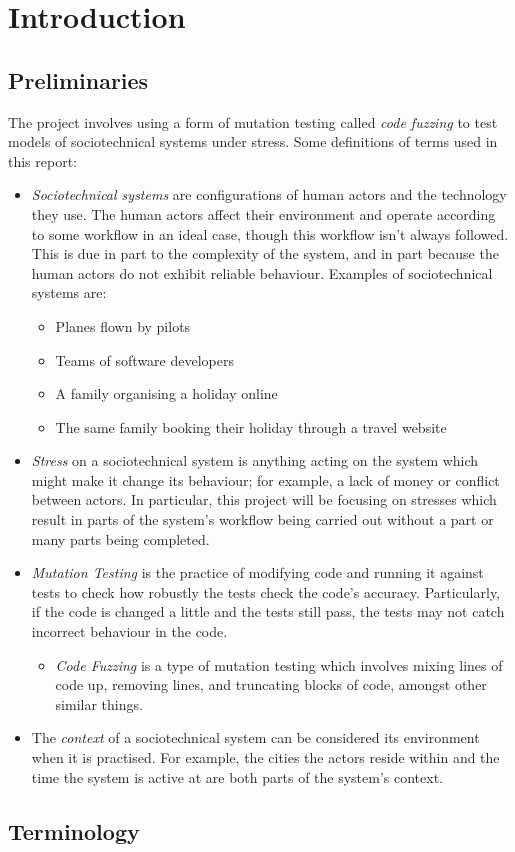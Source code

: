 \chapter{Introduction}
\label{intro}

\section{Preliminaries}
\label{preliminaries}

The project involves using a form of mutation testing called \emph{code fuzzing} to test models of sociotechnical systems under stress. Some definitions of terms used in this report: 
\begin{itemize}
\item \emph{Sociotechnical systems} are configurations of human actors and the technology they use. The human actors affect their environment and operate according to some workflow in an ideal case, though this workflow isn't always followed. This is due in part to the complexity of the system, and in part because the human actors do not exhibit reliable behaviour. Examples of sociotechnical systems are: \begin{itemize}
\item Planes flown by pilots
\item Teams of software developers
\item A family organising a holiday online
\item The same family booking their holiday through a travel website
\end{itemize} 
\item \emph{Stress} on a sociotechnical system is anything acting on the system which might make it change its behaviour; for example, a lack of money or conflict between actors. In particular, this project will be focusing on stresses which result in parts of the system's workflow being carried out without a part or many parts being completed. \par
\item \emph{Mutation Testing} is the practice of modifying code and running it against tests to check how robustly the tests check the code's accuracy. Particularly, if the code is changed a little and the tests still pass, the tests may not catch incorrect behaviour in the code. \begin{itemize}
\item \emph{Code Fuzzing} is a type of mutation testing which involves mixing lines of code up, removing lines, and truncating blocks of code, amongst other similar things. \par
\end{itemize}
\item The \emph{context} of a sociotechnical system can be considered its environment when it is practised. For example, the cities the actors reside within and the time the system is active at are both parts of the system's context.
\end{itemize}



\section{Terminology}
\label{introducing_technology}

